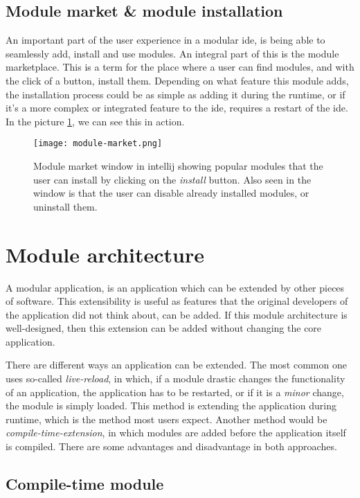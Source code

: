 \subsection{Module market \& module installation}

An important part of the user experience in a modular \gls*{ide}, is being able
to seamlessly add, install and use modules. An integral part of this is the
module marketplace. This is a term for the place where a user can find modules,
and with the click of a button, install them. Depending on what feature this
module adds, the installation process could be as simple as adding it during the
runtime, or if it's a more complex or integrated feature to the \gls*{ide},
requires a restart of the \gls*{ide}. In the picture \ref{pic:market}, we can see
this in action.

\begin{figure}
  \centering
  \texttt{[image: module-market.png]}
  \caption{
    Module market window in \gls*{intellij} showing popular modules that the user can
    install by clicking on the \textit{install} button. Also seen in the window is
    that the user can disable already installed modules, or uninstall them.
  }
  \label{pic:market}
\end{figure}

\section{Module architecture}

A modular application, is an application which can be extended by other pieces
of software. This extensibility is useful as features that the original
developers of the application did not think about, can be added. If this module
architecture is well-designed, then this extension can be added without changing
the core application.

There are different ways an application can be extended. The most common one
uses so-called \textit{live-reload}, in which, if a module drastic changes the
functionality of an application, the application has to be restarted, or if it
is a \textit{minor} change, the module is simply loaded. This method is
extending the application during runtime, which is the method most users
expect. Another method would be \textit{compile-time-extension}, in which
modules are added before the application itself is compiled. There are some
advantages and disadvantage in both approaches.

\subsection{Compile-time module}

